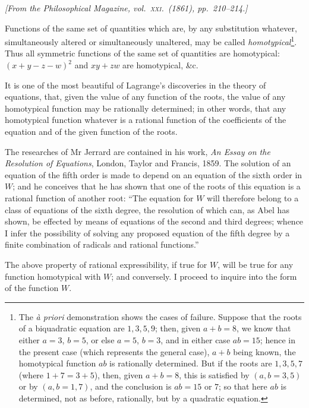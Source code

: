 \documentclass[11pt,a4paper]{article}
\begin{document}
\bigskip

\noindent\textit{[From the Philosophical Magazine, vol.\ \textsc{xxi}.\ (1861), pp.\ 210--214.]}

\bigskip

Functions of the same set of quantities which are, by any substitution whatever, simultaneously altered or simultaneously unaltered, may be called \emph{homotypical}\footnote{The \textit{\`{a} priori} demonstration shows the cases of failure. Suppose that the roots of a biquadratic equation are $1,3,5,9$; then, given $a+b=8$, we know that either $a=3$, $b=5$, or else $a=5$, $b=3$, and in either case $ab=15$; hence in the present case (which represents the general case), $a+b$ being known, the homotypical function $ab$ is rationally determined. But if the roots are $1,3,5,7$ (where $1+7=3+5$), then, given $a+b=8$, this is satisfied by $(a,b=3,5)$ or by $(a,b=1,7)$, and the conclusion is $ab=15$ or $7$; so that here $ab$ is determined, not as before, rationally, but by a quadratic equation.}. Thus all symmetric functions of the same set of quantities are homotypical: $(x+y-z-w)^2$ and $xy+zw$ are homotypical, \&c.

It is one of the most beautiful of Lagrange's discoveries in the theory of equations, that, given the value of any function of the roots, the value of any homotypical function may be rationally determined; in other words, that any homotypical function whatever is a rational function of the coefficients of the equation and of the given function of the roots.

The researches of Mr Jerrard are contained in his work, \textit{An Essay on the Resolution of Equations}, London, Taylor and Francis, 1859. The solution of an equation of the fifth order is made to depend on an equation of the sixth order in $W$; and he conceives that he has shown that one of the roots of this equation is a rational function of another root: ``The equation for $W$ will therefore belong to a class of equations of the sixth degree, the resolution of which can, as Abel has shown, be effected by means of equations of the second and third degrees; whence I infer the possibility of solving any proposed equation of the fifth degree by a finite combination of radicals and rational functions.''

The above property of rational expressibility, if true for $W$, will be true for any function homotypical with $W$; and conversely. I proceed to inquire into the form of the function $W$.
\end{document}
